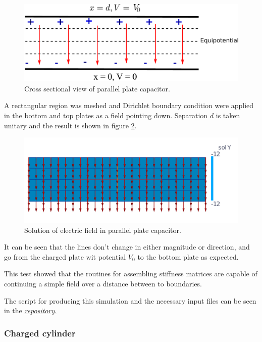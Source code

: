\begin{figure}
\centering
\includegraphics[scale=0.5]{./img/parallel_plate_capacitor.pdf}
\caption{Cross sectional view of parallel plate capacitor.}
\label{fig:parallel_plate}
\end{figure}

A rectangular region was meshed and Dirichlet boundary condition were applied in the bottom and top plates as a field pointing down. Separation $d$ is taken unitary and the result is shown in figure \ref{fig:capacitor}.

\begin{figure}
\centering
\includegraphics[scale=0.3]{./img/capacitor.pdf}
\caption{Solution of electric field in parallel plate capacitor.}
\label{fig:capacitor}
\end{figure}

It can be seen that the lines don't change in either magnitude or direction, and go from the charged plate wit potential $V_0$ to the bottom plate as expected.

This test showed that the routines for assembling stiffness matrices are capable of continuing a simple field over a distance between to boundaries.

The script for producing this simulation and the necessary input files can be seen in the 
\href{https://github.com/bebopsan/peyeQM/tree/Depuration/Lib/OOPyQM/Examples/Capacitor}{\textit{repository}.}

\subsubsection{Charged cylinder}

